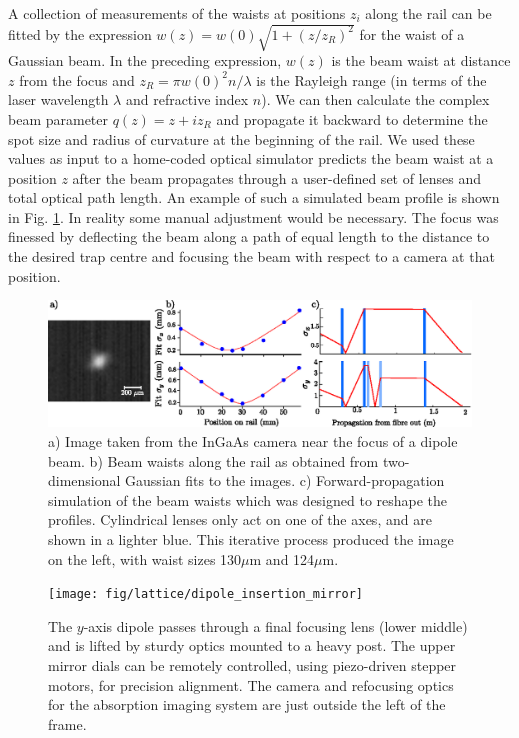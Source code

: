 	A collection of measurements of the waists at positions $z_i$ along the rail can be fitted by the expression $w(z) = w(0)\sqrt{1 + (z/z_R)^2}$ for the waist of a Gaussian beam.
	In the preceding expression, $w(z)$ is the beam waist at distance $z$ from the focus and $z_R=\pi w(0)^2n/\lambda$ is the Rayleigh range (in terms of the laser wavelength $\lambda$ and refractive index $n$).
	We can then calculate the complex beam parameter $q(z) = z + i z_R$ and propagate it backward to determine the spot size and radius of curvature at the beginning of the rail.
	We used these values as input to a home-coded optical simulator predicts the beam waist at a position $z$ after the beam propagates through a user-defined set of lenses and total optical path length.
	An example of such a simulated beam profile is shown in Fig. \ref{fig:profiling}.
	In reality some manual adjustment would be necessary.
	The focus was finessed by deflecting the beam along a path of equal length to the distance to the desired trap centre and focusing the beam with respect to a camera at that position.

	\begin{figure}
	\includegraphics[width=\textwidth]{fig/lattice/dipole_profle_combo}
	\caption{a) Image taken from the InGaAs camera near the focus of a dipole beam.
	b) Beam waists along the rail as obtained from two-dimensional Gaussian fits to the images.
	c) Forward-propagation simulation of the beam waists which was designed to reshape the profiles.
	Cylindrical lenses only act on one of the axes, and are shown in a lighter blue.
	This iterative process produced the image on the left, with waist sizes 130$\mu$m and 124$\mu$m.}
	\label{fig:profiling}
	\end{figure}



	\begin{figure}
		\begin{minipage}{0.4\textwidth}
		\vspace{0cm}
		\caption{The $y$-axis dipole passes through a final focusing lens (lower middle) and is lifted by sturdy optics mounted to a heavy post.
	The upper mirror dials can be remotely controlled, using piezo-driven stepper motors, for precision alignment.
	The camera and refocusing optics for the absorption imaging system are just outside the left of the frame.}
		\label{fig:lifetime}
		\end{minipage}
		\hfill
		\begin{minipage}{0.6\textwidth}
		\vspace{0cm}
		\texttt{[image: fig/lattice/dipole\_insertion\_mirror]} %
		\end{minipage}
	\end{figure}



